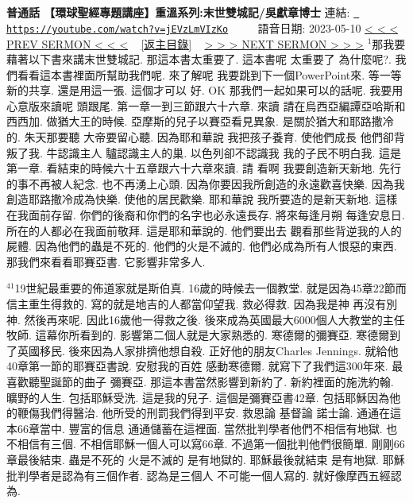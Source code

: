 \documentclass{book}
\begin{document}
\section{}
\label{sec:jEVzLmVIzKo}
\textbf{普通話 【環球聖經專題講座】重溫系列:末世雙城記/吳獻章博士}
\newline
\newline
連結: \href{https://youtube.com/watch?v=jEVzLmVIzKo}{\texttt{ https://youtube.com/watch?v=jEVzLmVIzKo}} ~~~~ 語音日期: 2023-05-10 
\newline
\newline
\hyperref[sec:qyGitWfwbVA]{\small{< < < PREV SERMON < < <}}
~
\hyperref[sec:index]{\small{[返主目錄]}}
~
\hyperref[sec:wANGDktiD_I]{\small{> > > NEXT SERMON > > >}}
\newline
\newline
$^{1}$那我要藉著以下書來講末世雙城記.
那這本書太重要了.
這本書呢 太重要了 為什麼呢?.
我們看看這本書裡面所幫助我們呢.
來了解呢 我要跳到下一個PowerPoint來.
等一等 新的共享.
還是用這一張.
這個才可以 好.
OK 那我們一起如果可以的話呢.
我要用心意版來讀呢 頭跟尾.
第一章一到三節跟六十六章.
來讀 請在烏西亞編譚亞哈斯和西西加.
做猶大王的時候.
亞摩斯的兒子以賽亞看見異象.
是關於猶大和耶路撒冷的.
朱天那要聽 大帝要留心聽.
因為耶和華說 我把孩子養育.
使他們成長 他們卻背叛了我.
牛認識主人 驢認識主人的巢.
以色列卻不認識我 我的子民不明白我.
這是第一章.
看結束的時候六十五章跟六十六章來讀.
請 看啊 我要創造新天新地.
先行的事不再被人紀念.
也不再湧上心頭.
因為你要因我所創造的永遠歡喜快樂.
因為我創造耶路撒冷成為快樂.
使他的居民歡樂.
耶和華說 我所要造的是新天新地.
這樣在我面前存留.
你們的後裔和你們的名字也必永遠長存.
將來每逢月朔 每逢安息日.
所在的人都必在我面前敬拜.
這是耶和華說的.
他們要出去 觀看那些背逆我的人的屍體.
因為他們的蟲是不死的.
他們的火是不滅的.
他們必成為所有人恨惡的東西.
那我們來看看耶賽亞書.
它影響非常多人.

$^{41}$19世紀最重要的佈道家就是斯伯真.
16歲的時候去一個教堂.
就是因為45章22節而信主重生得救的.
寫的就是地吉的人都當仰望我.
救必得救.
因為我是神 再沒有別神.
然後再來呢.
因此16歲他一得救之後.
後來成為英國最大6000個人大教堂的主任牧師.
這幕你所看到的.
影響第二個人就是大家熟悉的.
寒德爾的彌賽亞.
寒德爾到了英國移民.
後來因為人家排擠他想自殺.
正好他的朋友Charles Jennings.
就給他40章第一節的耶賽亞書說.
安慰我的百姓 感動寒德爾.
就寫下了我們這300年來.
最喜歡聽聖誕節的曲子 彌賽亞.
那這本書當然影響到新約了.
新約裡面的施洗約翰.
曠野的人生.
包括耶穌受洗.
這是我的兒子.
這個是彌賽亞書42章.
包括耶穌因為他的鞭傷我們得醫治.
他所受的刑罰我們得到平安.
救恩論 基督論 諾士論.
通通在這本66章當中.
豐富的信息 通通儲蓄在這裡面.
當然批判學者他們不相信有地獄.
也不相信有三個.
不相信耶穌一個人可以寫66章.
不過第一個批判他們很簡單.
剛剛66章最後結束.
蟲是不死的 火是不滅的 是有地獄的.
耶穌最後就結束 是有地獄.
耶穌批判學者是認為有三個作者.
認為是三個人 不可能一個人寫的.
就好像摩西五經認為.
\end{document}
